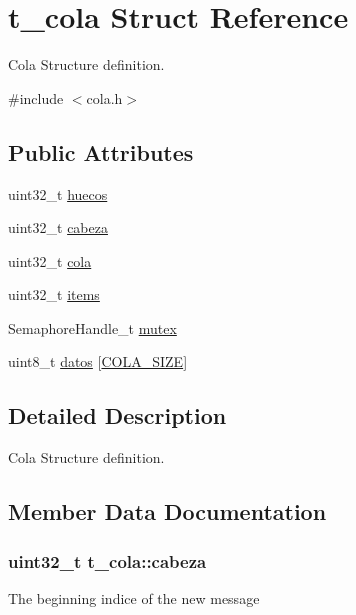 \hypertarget{structt__cola}{}\section{t\+\_\+cola Struct Reference}
\label{structt__cola}


Cola Structure definition.  




{\ttfamily \#include $<$cola.\+h$>$}

\subsection*{Public Attributes}
\begin{DoxyCompactItemize}
\item 
uint32\+\_\+t \hyperlink{structt__cola_aacfbba6a49f77a9a6f52a93c95808095}{huecos}
\item 
uint32\+\_\+t \hyperlink{structt__cola_a082fff65fd0192c1b1bb3bd952e47127}{cabeza}
\item 
uint32\+\_\+t \hyperlink{structt__cola_a8b818616f62d19293390150f6c05b0c4}{cola}
\item 
uint32\+\_\+t \hyperlink{structt__cola_af6a7ddbb78818f9185454bdda842a355}{items}
\item 
Semaphore\+Handle\+\_\+t \hyperlink{structt__cola_a6ab2b175f6265b861c97da1db60eaaf5}{mutex}
\item 
uint8\+\_\+t \hyperlink{structt__cola_a61215b1ae633a2a4463e0abf0a796f41}{datos} \mbox{[}\hyperlink{group___cola___private___define_gad5b7f14b39751409f4090d7c2d45f915}{C\+O\+L\+A\+\_\+\+S\+I\+ZE}\mbox{]}
\end{DoxyCompactItemize}


\subsection{Detailed Description}
Cola Structure definition. 

\subsection{Member Data Documentation}
\subsubsection[{\texorpdfstring{cabeza}{cabeza}}]{\setlength{\rightskip}{0pt plus 5cm}uint32\+\_\+t t\+\_\+cola\+::cabeza}\hypertarget{structt__cola_a082fff65fd0192c1b1bb3bd952e47127}{}\label{structt__cola_a082fff65fd0192c1b1bb3bd952e47127}
The beginning indice of the new message 
